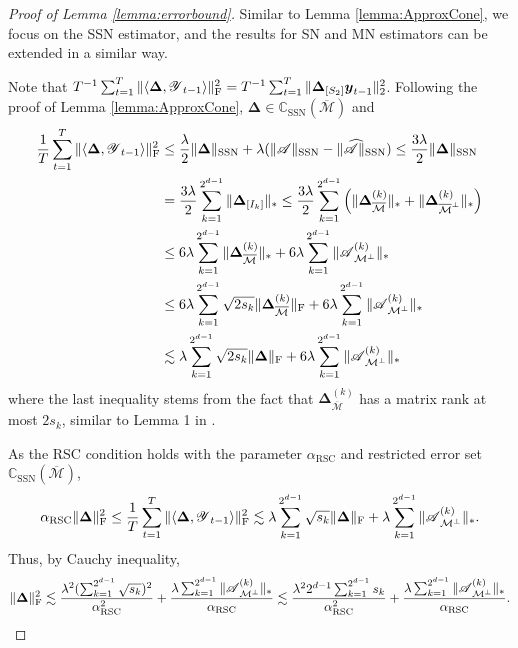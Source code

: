 \documentclass[12pt]{article}
\newcommand{\bm}{\boldsymbol}
\newcommand{\cm}[1]{\mbox{\boldmath$\mathscr{#1}$}}
\begin{document}
\begin{proof}[Proof of Lemma \ref{lemma:errorbound}]
	
	Similar to Lemma \ref{lemma:ApproxCone}, we focus on the SSN estimator, and the results for SN and MN estimators can be extended in a similar way.
	
	Note that $T^{-1}\sum_{t=1}^T\|\langle\bm{\Delta},\cm{Y}_{t-1}\rangle\|_\text{F}^2=T^{-1}\sum_{t=1}^T\|\bm{\Delta}_{[S_2]}\bm{y}_{t-1}\|_2^2$.
	Following the proof of Lemma \ref{lemma:ApproxCone}, $\bm{\Delta}\in\mathbb{C}_{\text{SSN}}(\overline{\mathcal{M}})$ and
	\begin{equation}\begin{split}
	\frac{1}{T}\sum_{t=1}^T\|\langle\bm{\Delta},\cm{Y}_{t-1}\rangle\|_\text{F}^2&\leq\frac{\lambda}{2}\|\bm{\Delta}\|_{\text{SSN}}+\lambda(\|\cm{A}\|_{\text{SSN}}-\|\cm{\widehat{A}}\|_{\text{SSN}})\leq\frac{3\lambda}{2}\|\bm{\Delta}\|_{\text{SSN}}\\
	&=\frac{3\lambda}{2}\sum_{k=1}^{2^{d-1}}\|\bm{\Delta}_{[I_k]}\|_*\leq\frac{3\lambda}{2}\sum_{k=1}^{2^{d-1}}\left(\|\bm{\Delta}_{\overline{\mathcal{M}}}^{(k)}\|_*+\|\bm{\Delta}_{\overline{\mathcal{M}}^\perp}^{(k)}\|_*\right)\\
	&\leq6\lambda\sum_{k=1}^{2^{d-1}}\|\bm{\Delta}_{\overline{\mathcal{M}}}^{(k)}\|_*+6\lambda\sum_{k=1}^{2^{d-1}}\|\cm{A}^{(k)}_{\mathcal{M}^\perp}\|_{*}\\
	&\leq6\lambda\sum_{k=1}^{2^{d-1}}\sqrt{2s_k}\|\bm{\Delta}_{\overline{\mathcal{M}}}^{(k)}\|_{\text{F}}+6\lambda\sum_{k=1}^{2^{d-1}}\|\cm{A}^{(k)}_{\mathcal{M}^\perp}\|_{*}\\
	&\lesssim\lambda\sum_{k=1}^{2^{d-1}}\sqrt{2s_k}\|\bm{\Delta}\|_{\text{F}}+6\lambda\sum_{k=1}^{2^{d-1}}\|\cm{A}^{(k)}_{\mathcal{M}^\perp}\|_{*}
	\end{split}\end{equation}
	where the last inequality stems from the fact that $\bm{\Delta}_{\overline{\mathcal{M}}}^{(k)}$ has a matrix rank at most $2s_k$, similar to Lemma 1 in \citet{negahban2011estimation}.
	
	As the RSC condition holds with the parameter $\alpha_{\text{RSC}}$ and restricted error set $\mathbb{C}_{\text{SSN}}(\overline{\mathcal{M}})$,
	\begin{equation}
	\alpha_{\text{RSC}}\|\bm{\Delta}\|_{\text{F}}^2\leq	\frac{1}{T}\sum_{t=1}^T\|\langle\bm{\Delta},\cm{Y}_{t-1}\rangle\|_\text{F}^2\lesssim \lambda\sum_{k=1}^{2^{d-1}}\sqrt{s_k}\|\bm{\Delta}\|_\text{F}+\lambda\sum_{k=1}^{2^{d-1}}\|\cm{A}^{(k)}_{\mathcal{M}^\perp}\|_{*}.
	\end{equation}
	Thus, by Cauchy inequality,
	\begin{equation}
		\begin{split}
			\|\bm{\Delta}\|_\text{F}^2\lesssim\frac{\lambda^2(\sum_{k=1}^{2^{d-1}}\sqrt{s_k})^2}{\alpha_{\text{RSC}}^2}+\frac{\lambda\sum_{k=1}^{2^{d-1}}\|\cm{A}^{(k)}_{\mathcal{M}^\perp}\|_{*}}{\alpha_{\text{RSC}}}
			\lesssim\frac{\lambda^22^{d-1}\sum_{k=1}^{2^{d-1}}s_k}{\alpha_{\text{RSC}}^2}+\frac{\lambda\sum_{k=1}^{2^{d-1}}\|\cm{A}^{(k)}_{\mathcal{M}^\perp}\|_{*}}{\alpha_{\text{RSC}}}.
		\end{split}
	\end{equation}	


\end{proof}
\end{document}
